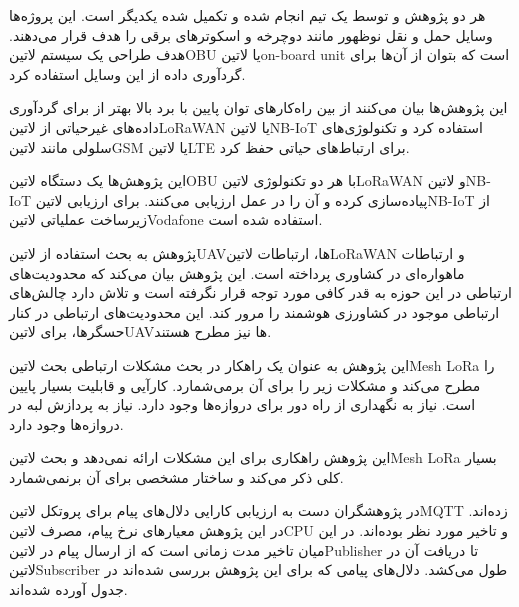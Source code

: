 
هر دو پژوهش  و  توسط یک تیم انجام شده و تکمیل شده یکدیگر است. این پروژه‌ها وسایل حمل و نقل نوظهور مانند دوچرخه و اسکوترهای برقی را هدف قرار می‌دهند.
هدف طراحی یک سیستم ‌لاتین{OBU} یا ‌لاتین{on-board unit} است که بتوان از آن‌ها برای گردآوری داده از این وسایل استفاده کرد.

این پژوهش‌ها بیان می‌کنند از بین راه‌کارهای توان پایین با برد بالا بهتر از برای گردآوری داده‌های غیرحیاتی از ‌لاتین{LoRaWAN} یا ‌لاتین{NB-IoT} استفاده کرد
و تکنولوژی‌های سلولی مانند ‌لاتین{GSM} یا ‌لاتین{LTE} برای ارتباط‌های حیاتی حفظ کرد.

این پژوهش‌ها یک دستگاه ‌لاتین{OBU} با هر دو تکنولوژی ‌لاتین{LoRaWAN} و ‌لاتین{NB-IoT} پیاده‌سازی کرده و آن را در عمل ارزیابی می‌کنند.
برای ارزیابی ‌لاتین{NB-IoT} از زیرساخت عملیاتی ‌لاتین{Vodafone} استفاده شده است.


پژوهش  به بحث استفاده از ‌لاتین{UAV}ها، ارتباطات ‌لاتین{LoRaWAN} و ارتباطات ماهواره‌ای در کشاوری پرداخته است.
این پژوهش بیان می‌کند که محدودیت‌های ارتباطی در این حوزه به قدر کافی مورد توجه قرار نگرفته است و تلاش دارد چالش‌های ارتباطی موجود در کشاورزی هوشمند را مرور کند.
این محدودیت‌های ارتباطی در کنار حسگرها، برای ‌لاتین{UAV}ها نیز مطرح هستند.

این پژوهش به عنوان یک راهکار در بحث مشکلات ارتباطی بحث ‌لاتین{Mesh LoRa} را مطرح می‌کند و مشکلات زیر را برای آن برمی‌شمارد.
 کارآیی و قابلیت بسیار پایین است.
 نیاز به نگهداری از راه دور برای دروازه‌ها وجود دارد.
 نیاز به پردازش لبه در دروازه‌ها وجود دارد.

این پژوهش راهکاری برای این مشکلات ارائه نمی‌دهد و بحث ‌لاتین{Mesh LoRa} بسیار کلی ذکر می‌کند و ساختار مشخصی برای آن برنمی‌شمارد.


در  پژوهشگران دست به ارزیابی کارایی دلال‌های پیام برای پروتکل ‌لاتین{MQTT} زده‌اند. در این پژوهش معیارهای نرخ پیام، مصرف ‌لاتین{CPU} و تاخیر مورد نظر بوده‌اند.
در این میان تاخیر مدت زمانی است که از ارسال پیام در ‌لاتین{Publisher} تا دریافت آن در ‌لاتین{Subscriber} طول می‌کشد.
دلال‌های پیامی که برای این پژوهش بررسی شده‌اند در جدول  آورده شده‌اند.

